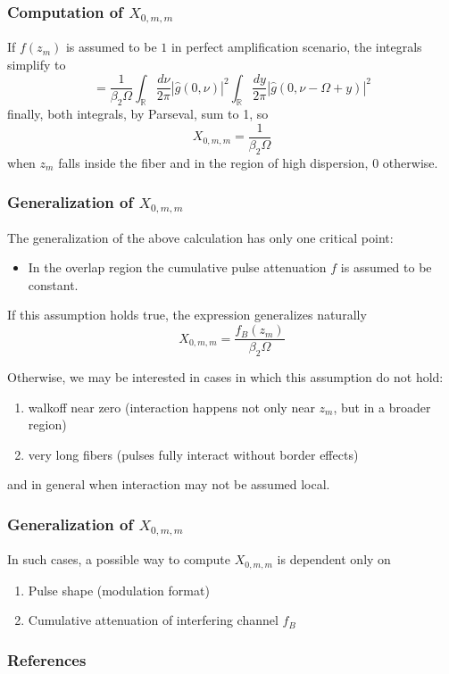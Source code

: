 \documentclass[8pt]{beamer} %
\begin{document}
\begin{frame}
	\frametitle{Computation of $X_{0, m, m}$}
	If $f(z_m)$ is assumed to be $1$ in perfect amplification scenario, the integrals simplify to
	\begin{equation}
		=\frac{1}{ \beta_2 \Omega}\int_{\mathbb{R}} \frac{d\nu}{2\pi}  |\hat{g}(0, \nu)|^2 \int_{\mathbb{R}}  \frac{dy}{2\pi} \left|\hat{g}\left(0, \nu-\Omega + y\right)\right|^2
	\end{equation}
	finally, both integrals, by Parseval, sum to 1, so 
	\begin{equation}
		X_{0, m, m} = \frac{1}{\beta_2 \Omega}  
	\end{equation}
	when $z_m$ falls inside the fiber and in the region of high dispersion, $0$ otherwise.
\end{frame}

\begin{frame}
	\frametitle{Generalization of $X_{0, m, m}$}
	The generalization of the above calculation has only one critical point:
	\begin{itemize}
		\item In the overlap region the cumulative pulse attenuation $f$ is assumed to be constant.
	\end{itemize}
	If this assumption holds true, the expression generalizes naturally
	\begin{equation}
		X_{0, m, m} = \frac{f_B(z_m)}{\beta_2 \Omega}	
	\end{equation}
	
	Otherwise, we may be interested in cases in which this assumption do not hold:
	\begin{enumerate}
		\item walkoff near zero (interaction happens not only near $z_m$, but in a broader region)
		\item very long fibers (pulses fully interact without border effects)
	\end{enumerate}
	and in general when interaction may not be assumed local. 	
\end{frame}

\begin{frame}
	\frametitle{Generalization of $X_{0, m, m}$}
	In such cases, a possible way to compute $X_{0, m, m}$ is dependent only on
	\begin{enumerate}
		\item Pulse shape (modulation format)
		\item Cumulative attenuation of interfering channel $f_B$
	\end{enumerate}
\end{frame}

\begin{frame}
	\frametitle{References}
 \printbibliography
\end{frame}
\end{document}
